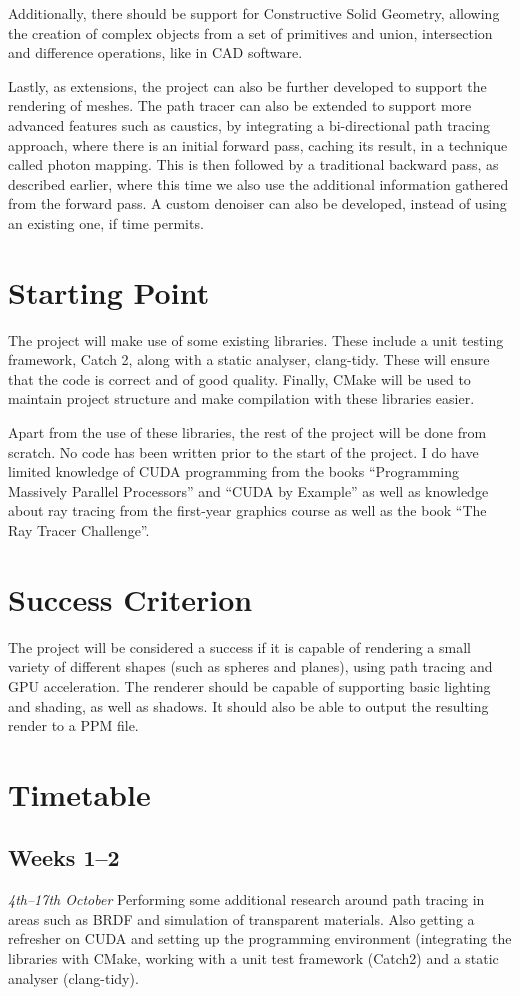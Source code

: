 \documentclass[12pt, a4paper]{article}
\newcommand{\newtime}[3]{
    \subsection*{#1}
    \vspace{-\baselineskip}
    \emph{#2}
    \vspace{\baselineskip}
    \newline
    #3
}
\begin{document}
    Additionally, there should be support for Constructive Solid Geometry, allowing the creation of complex objects from a set of primitives and union, intersection and difference operations, like in CAD software.

    Lastly, as extensions, the project can also be further developed to support the rendering of meshes. The path tracer can also be extended to support more advanced features such as caustics, by integrating a bi-directional path tracing approach, where there is an initial forward pass, caching its result, in a technique called photon mapping. This is then followed by a traditional backward pass, as described earlier, where this time we also use the additional information gathered from the forward pass. A custom denoiser can also be developed, instead of using an existing one, if time permits.

    \section*{Starting Point}
    The project will make use of some existing libraries. These include a unit testing framework, Catch 2, along with a static analyser, clang-tidy. These will ensure that the code is correct and of good quality. Finally, CMake will be used to maintain project structure and make compilation with these libraries easier.

    Apart from the use of these libraries, the rest of the project will be done from scratch. No code has been written prior to the start of the project. I do have limited knowledge of CUDA programming from the books “Programming Massively Parallel Processors” and “CUDA by Example” as well as knowledge about ray tracing from the first-year graphics course as well as the book “The Ray Tracer Challenge”.

    \section*{Success Criterion}
    The project will be considered a success if it is capable of rendering a small variety of different shapes (such as spheres and planes), using path tracing and GPU acceleration. The renderer should be capable of supporting basic lighting and shading, as well as shadows. It should also be able to output the resulting render to a PPM file.

    \section*{Timetable}
    \newtime{Weeks 1--2}{4th--17th October}{Performing some additional research around path tracing in areas such as BRDF and simulation of transparent materials. Also getting a refresher on CUDA and setting up the programming environment (integrating the libraries with CMake, working with a unit test framework (Catch2) and a static analyser (clang-tidy).}
\end{document}
